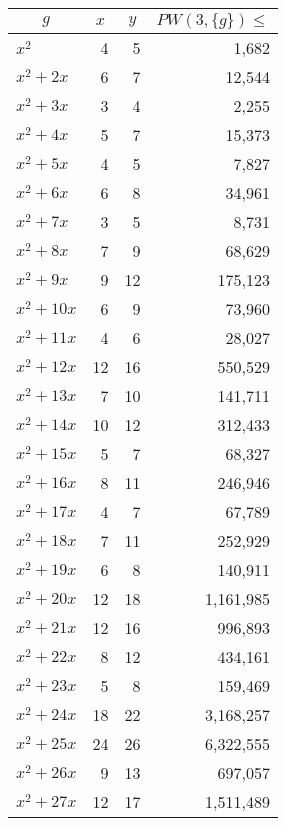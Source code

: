 \documentclass[a4paper]{amsproc}
\theoremstyle{plain}
\theoremstyle{named}
\begin{document}
\begin{longtable}{ | l | r | r | r | }
\caption{}\\
\hline

\multicolumn{1}{|c|}{$g$} &
\multicolumn{1}{|c|}{$x$} &
\multicolumn{1}{|c|}{$y$} &
\multicolumn{1}{|c|}{$PW(3, \{g\}) \leq$} \\ \hline
\endhead


$x^2$ & 4 & 5 & 1{,}682 \\ \hline
$x^2 + 2x$ & 6 & 7 & 12{,}544 \\ \hline
$x^2 + 3x$ & 3 & 4 & 2{,}255 \\ \hline
$x^2 + 4x$ & 5 & 7 & 15{,}373 \\ \hline
$x^2 + 5x$ & 4 & 5 & 7{,}827 \\ \hline
$x^2 + 6x$ & 6 & 8 & 34{,}961 \\ \hline
$x^2 + 7x$ & 3 & 5 & 8{,}731 \\ \hline
$x^2 + 8x$ & 7 & 9 & 68{,}629 \\ \hline
$x^2 + 9x$ & 9 & 12 & 175{,}123 \\ \hline
$x^2 + 10x$ & 6 & 9 & 73{,}960 \\ \hline
$x^2 + 11x$ & 4 & 6 & 28{,}027 \\ \hline
$x^2 + 12x$ & 12 & 16 & 550{,}529 \\ \hline
$x^2 + 13x$ & 7 & 10 & 141{,}711 \\ \hline
$x^2 + 14x$ & 10 & 12 & 312{,}433 \\ \hline
$x^2 + 15x$ & 5 & 7 & 68{,}327 \\ \hline
$x^2 + 16x$ & 8 & 11 & 246{,}946 \\ \hline
$x^2 + 17x$ & 4 & 7 & 67{,}789 \\ \hline
$x^2 + 18x$ & 7 & 11 & 252{,}929 \\ \hline
$x^2 + 19x$ & 6 & 8 & 140{,}911 \\ \hline
$x^2 + 20x$ & 12 & 18 & 1{,}161{,}985 \\ \hline
$x^2 + 21x$ & 12 & 16 & 996{,}893 \\ \hline
$x^2 + 22x$ & 8 & 12 & 434{,}161 \\ \hline
$x^2 + 23x$ & 5 & 8 & 159{,}469 \\ \hline
$x^2 + 24x$ & 18 & 22 & 3{,}168{,}257 \\ \hline
$x^2 + 25x$ & 24 & 26 & 6{,}322{,}555 \\ \hline
$x^2 + 26x$ & 9 & 13 & 697{,}057 \\ \hline
$x^2 + 27x$ & 12 & 17 & 1{,}511{,}489 \\ \hline

\end{longtable}
\end{document}
